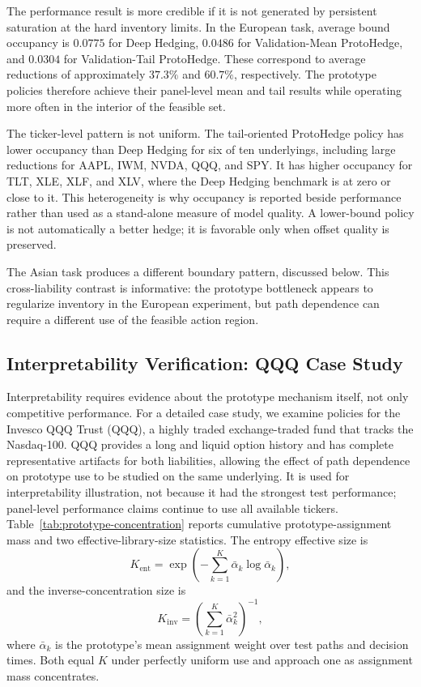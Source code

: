 \documentclass[sigconf]{acmart}
\begin{document}
The performance result is more credible if it is not generated by persistent
saturation at the hard inventory limits. In the European task, average bound
occupancy is $0.0775$ for Deep Hedging, $0.0486$ for Validation-Mean
ProtoHedge, and $0.0304$ for Validation-Tail ProtoHedge. These correspond to
average reductions of approximately $37.3\%$ and $60.7\%$, respectively. The
prototype policies therefore achieve their panel-level mean and tail results
while operating more often in the interior of the feasible set.

The ticker-level pattern is not uniform. The tail-oriented ProtoHedge policy
has lower occupancy than Deep Hedging for six of ten underlyings, including
large reductions for AAPL, IWM, NVDA, QQQ, and SPY. It has higher occupancy for
TLT, XLE, XLF, and XLV, where the Deep Hedging benchmark is at zero or close to
it. This heterogeneity is why occupancy is reported beside performance rather
than used as a stand-alone measure of model quality. A lower-bound policy is
not automatically a better hedge; it is favorable only when offset quality is
preserved.

The Asian task produces a different boundary pattern, discussed below. This
cross-liability contrast is informative: the prototype bottleneck appears to
regularize inventory in the European experiment, but path dependence can
require a different use of the feasible action region.

\subsection{Interpretability Verification: QQQ Case Study}
\label{subsec:interpretability_results}

Interpretability requires evidence about the prototype mechanism itself, not
only competitive performance. For a detailed case study, we examine policies
for the Invesco QQQ Trust (QQQ), a highly traded exchange-traded fund that
tracks the Nasdaq-100. QQQ provides a long and liquid option history and has
complete representative artifacts for both liabilities, allowing the effect
of path dependence on prototype use to be studied on the same underlying. It
is used for interpretability illustration, not because it had the strongest
test performance; panel-level performance claims continue to use all available
tickers. Table~\ref{tab:prototype-concentration}
reports cumulative prototype-assignment mass and two effective-library-size
statistics. The entropy effective size is
\[
K_{\mathrm{ent}}=\exp\!\left(-\sum_{k=1}^{K}\bar\alpha_k
\log\bar\alpha_k\right),
\]
and the inverse-concentration size is
\[
K_{\mathrm{inv}}=\left(\sum_{k=1}^{K}\bar\alpha_k^2\right)^{-1},
\]
where $\bar\alpha_k$ is the prototype's mean assignment weight over test paths
and decision times. Both equal $K$ under perfectly uniform use and approach
one as assignment mass concentrates.
\end{document}

